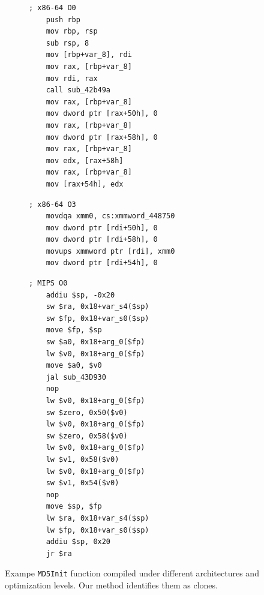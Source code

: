 \begin{figure}[t]
\centering
\begin{minipage}[t]{0.45\linewidth}   %
  \begin{subfigure}[t]{\linewidth}
    \begin{verbatim}
; x86-64 O0
    push rbp
    mov rbp, rsp
    sub rsp, 8
    mov [rbp+var_8], rdi
    mov rax, [rbp+var_8]
    mov rdi, rax
    call sub_42b49a
    mov rax, [rbp+var_8]
    mov dword ptr [rax+50h], 0
    mov rax, [rbp+var_8]
    mov dword ptr [rax+58h], 0
    mov rax, [rbp+var_8]
    mov edx, [rax+58h]
    mov rax, [rbp+var_8]
    mov [rax+54h], edx
    \end{verbatim}
  \end{subfigure}
  \vspace{0.5em} %

  \begin{subfigure}[t]{\linewidth}
    \begin{verbatim}
; x86-64 O3
    movdqa xmm0, cs:xmmword_448750
    mov dword ptr [rdi+50h], 0
    mov dword ptr [rdi+58h], 0
    movups xmmword ptr [rdi], xmm0
    mov dword ptr [rdi+54h], 0
    \end{verbatim}
  \end{subfigure}
\end{minipage}%
\hfill
\begin{minipage}[t]{0.5\linewidth}   %
  \begin{subfigure}[t]{\linewidth}
    \begin{verbatim}
; MIPS O0
    addiu $sp, -0x20
    sw $ra, 0x18+var_s4($sp)
    sw $fp, 0x18+var_s0($sp)
    move $fp, $sp
    sw $a0, 0x18+arg_0($fp)
    lw $v0, 0x18+arg_0($fp)
    move $a0, $v0
    jal sub_43D930
    nop 
    lw $v0, 0x18+arg_0($fp)
    sw $zero, 0x50($v0)
    lw $v0, 0x18+arg_0($fp)
    sw $zero, 0x58($v0)
    lw $v0, 0x18+arg_0($fp)
    lw $v1, 0x58($v0)
    lw $v0, 0x18+arg_0($fp)
    sw $v1, 0x54($v0)
    nop 
    move $sp, $fp
    lw $ra, 0x18+var_s4($sp)
    lw $fp, 0x18+var_s0($sp)
    addiu $sp, 0x20
    jr $ra
    \end{verbatim}
  \end{subfigure}
\end{minipage}

\caption{Exampe \texttt{MD5Init} function compiled under different architectures
and optimization levels. Our method identifies them as clones.}
\label{asm-diff}
\end{figure}


